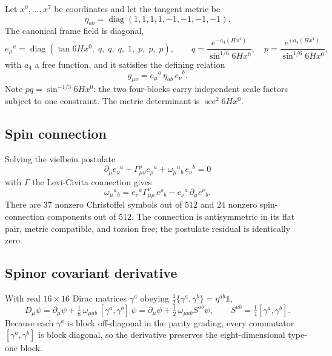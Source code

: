 \documentclass[11pt]{article}
\begin{document}
Let $x^0,\dots,x^7$ be coordinates and let the tangent metric be
\begin{equation}
  \eta_{ab} = \operatorname{diag}(1,1,1,1,-1,-1,-1,-1).
\end{equation}
The canonical frame field is diagonal,
\begin{equation}
  e_\mu{}^a = \operatorname{diag}\!\left(
  \tan 6Hx^0,\; q,\;q,\;q,\;1,\;p,\;p,\;p\right),
  \qquad
  q = \frac{e^{-a_4(Hx^4)}}{\sin^{1/6} 6Hx^0},
  \quad
  p = \frac{e^{+a_4(Hx^4)}}{\sin^{1/6} 6Hx^0},
\end{equation}
with $a_4$ a free function, and it satisfies the defining relation
\begin{equation}
  g_{\mu\nu} = e_\mu{}^a\,\eta_{ab}\,e_\nu{}^b .
\end{equation}
Note $pq=\sin^{-1/3}6Hx^0$: the two four-blocks carry independent scale factors
subject to one constraint. The metric determinant is $\sec^2 6Hx^0$.

\subsection{Spin connection}

Solving the vielbein postulate
\begin{equation}
  \partial_\mu e_\nu{}^a - \Gamma^\rho_{\mu\nu}e_\rho{}^a
  + \omega_\mu{}^a{}_b\,e_\nu{}^b = 0
  \label{eq:postulate}
\end{equation}
with $\Gamma$ the Levi-Civita connection gives
\begin{equation}
  \omega_\mu{}^a{}_b
  = e_\nu{}^a\Gamma^\nu_{\mu\rho}\,e^\rho{}_b
  - e_\nu{}^a\,\partial_\mu e^\nu{}_b .
\end{equation}
There are $37$ nonzero Christoffel symbols out of $512$ and $24$ nonzero
spin-connection components out of $512$. The connection is antisymmetric in its
flat pair, metric compatible, and torsion free; the postulate residual is
identically zero.

\subsection{Spinor covariant derivative}

With real $16\times16$ Dirac matrices $\gamma^a$ obeying
$\tfrac12\{\gamma^a,\gamma^b\}=\eta^{ab}\mathbb{1}$,
\begin{equation}
  D_\mu\psi = \partial_\mu\psi
  + \tfrac18\,\omega_{\mu ab}\,[\gamma^a,\gamma^b]\,\psi
  = \partial_\mu\psi + \tfrac12\,\omega_{\mu ab}S^{ab}\psi ,
  \qquad S^{ab}=\tfrac14[\gamma^a,\gamma^b].
\end{equation}
Because each $\gamma^a$ is block off-diagonal in the parity grading, every
commutator $[\gamma^a,\gamma^b]$ is block diagonal, so the derivative preserves
the eight-dimensional type-one block.
\end{document}
